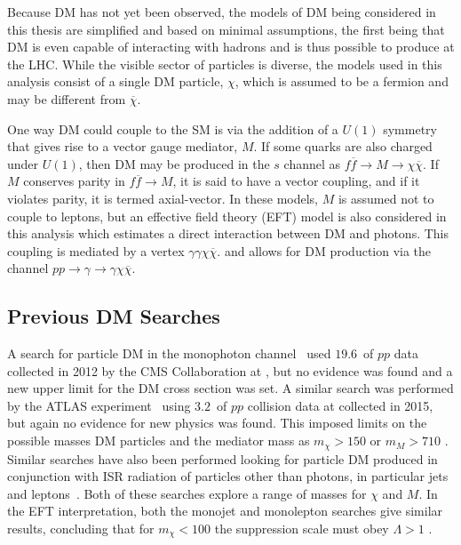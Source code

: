   Because DM has not yet been observed, 
   the models of DM being considered in this thesis are
   simplified and based on minimal assumptions,
   the first being that DM is even capable of interacting
   with hadrons and is thus possible to produce
   at the LHC.
  While the visible sector of particles is diverse,
   the models used in this analysis
   consist of a single DM particle,
   $\chi$, which is assumed to be a fermion
   and may be different from $\overline{\chi}$.

  One way DM could couple to the SM is via the
   addition of a $U(1)$ symmetry that
   gives rise to a vector gauge mediator, $M$.
  If some quarks are also charged under
   $U(1)$, then DM may be produced in the
   $s$ channel as
   $f\overline{f}\rightarrow M\rightarrow\chi\overline{\chi}$.
  If $M$ conserves parity in $f\overline{f}\rightarrow M$,
   it is said to have a vector coupling,
   and if it violates parity, it is
   termed axial-vector.
  In these models, $M$ is assumed not
   to couple to leptons, but
   an effective field theory (EFT)
   model is also considered in this analysis
   which estimates a direct interaction
   between DM and photons. 
  This coupling is mediated by a vertex
   $\gamma\gamma\chi\overline{\chi}$.
   and allows for DM production via
   the channel
   $pp\rightarrow\gamma\rightarrow\gamma\chi\overline{\chi}$.


\subsection{Previous DM Searches}

A search for particle DM in the monophoton channel~\cite{Khachatryan:2014rwa}
  used $19.6$~\fbinv of $pp$ data collected in 2012 by the CMS Collaboration at
  \TeV, but no evidence was found and a new upper limit
 for the DM cross section was set.
A similar search was performed by the ATLAS experiment~\cite{Aaboud:2016uro}
 using $3.2$~\fbinv of $pp$ collision data at  \TeV
 collected in 2015, but again no evidence for new physics was found. 
This imposed limits on the possible masses DM particles
 and the mediator mass as $m_\chi > 150$ \GeV or
 $m_M > 710$ \GeV.
Similar searches have also been performed looking for
 particle DM produced in conjunction with ISR radiation of
 particles other than photons, in particular jets~\cite{bib:monojet}
 and leptons~\cite{Khachatryan:2014tva}.
Both of these searches explore a range of masses for $\chi$ and $M$.
In the EFT interpretation, both the monojet and monolepton
 searches give similar results, concluding that for $m_\chi<100$ \GeV
 the suppression scale must obey $\Lambda > 1$ \TeV.
















